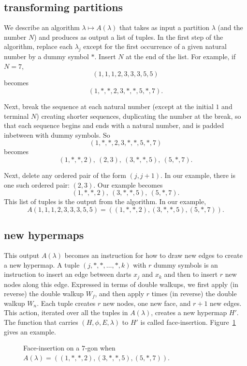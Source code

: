 \subsection{transforming partitions}

We describe an algorithm $\lambda\mapsto A(\lambda)$ that takes
as input a partition $\lambda$ (and the number $N$)
and produces as output a list of
tuples.
In the first step of the algorithm,
replace each $\lambda_j$ except for the
first occurrence of a given natural number by a dummy symbol $*$.
Insert $N$ at the end of the list. For example, if $N=7$,
    $$(1,1,1,2,3,3,3,5,5)$$ becomes
    $$(1,*,*,2,3,*,*,5,*,7).$$

Next, break the sequence at each natural number (except at the initial $1$
and terminal $N$)
creating shorter sequences, duplicating the number at the break,
so that each sequence begins and ends with a natural number,
and is padded inbetween with dummy symbols. So
    $$(1,*,*,2,3,*,*,5,*,7)$$ becomes
$$(1,*,*,2),\ (2,3),\ (3,*,*,5),\ (5,*,7).$$

Next,
delete any ordered pair of the form $(j,j+1)$. In our example, there
is one such ordered pair: $(2,3)$.  Our example becomes
  $$
  (1,*,*,2),\  (3,*,*,5),\ (5,*,7).
  $$
This list of tuples is the output from the algorithm.
In our example,
  $$A(1,1,1,2,3,3,3,5,5) = ((1,*,*,2),(3,*,*,5),(5,*,7)).$$



\subsection{new hypermaps}

This output $A(\lambda)$
becomes an instruction for how to draw new edges to create a
new hypermap. A tuple $(j,*,*,\ldots,*,k)$ with $r$ dummy symbols
is an instruction to insert an edge between darts $x_j$ and $x_k$
and then to insert $r$ new nodes along this edge.
Expressed in terms of double walkups, we first apply (in
reverse) the double walkup $W_f$, and then apply $r$ times (in
reverse) the double walkup $W_n$.  Each tuple creates $r$ new
nodes, one new face, and $r+1$ new edges.  This action, 
iterated over all the tuples in $A(\lambda)$, creates a new hypermap
$H'$. 
The function that carries
$(H,\phi,E,\lambda)$ to $H'$ is called
face-insertion.  
Figure~\ref{fig:7darts} gives an example.


\begin{figure}[htb]
  \centering
  \caption{Face-insertion on a $7$-gon when
   $A(\lambda) = ((1,*,*,2),(3,*,*,5),(5,*,7))$.}
  \label{fig:7darts}
\end{figure}


